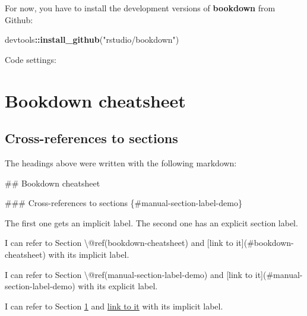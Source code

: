 \documentclass [11pt, proquest] {uwthesis}[2015/03/03]
\newenvironment{Shaded}{}{}
\newcommand{\KeywordTok}[1]{\textcolor[rgb]{0.00,0.44,0.13}{\textbf{{#1}}}}
\newcommand{\DataTypeTok}[1]{\textcolor[rgb]{0.56,0.13,0.00}{{#1}}}
\newcommand{\DecValTok}[1]{\textcolor[rgb]{0.25,0.63,0.44}{{#1}}}
\newcommand{\StringTok}[1]{\textcolor[rgb]{0.25,0.44,0.63}{{#1}}}
\newcommand{\OtherTok}[1]{\textcolor[rgb]{0.00,0.44,0.13}{{#1}}}
\newcommand{\FunctionTok}[1]{\textcolor[rgb]{0.02,0.16,0.49}{{#1}}}
\newcommand{\NormalTok}[1]{{#1}}
\newcommand{\OperatorTok}[1]{\textcolor[rgb]{0.00,0.44,0.13}{\textbf{{#1}}}}
\begin{document}
For now, you have to install the development versions of
\textbf{bookdown} from Github:
\begin{Shaded}
\begin{Highlighting}[]
\NormalTok{devtools}\OperatorTok{::}\KeywordTok{install_github}\NormalTok{(}\StringTok{"rstudio/bookdown"}\NormalTok{)}
\end{Highlighting}
\end{Shaded}
Code settings:
\begin{Shaded}
\end{Shaded}
\hypertarget{bookdown-cheatsheet}{\section{Bookdown
cheatsheet}\label{bookdown-cheatsheet}}

\hypertarget{manual-section-label-demo}{\subsection{Cross-references to
sections}\label{manual-section-label-demo}}

The headings above were written with the following markdown:
\begin{Shaded}
\begin{Highlighting}[]
\FunctionTok{## Bookdown cheatsheet}

\FunctionTok{### Cross-references to sections \{#manual-section-label-demo\}}
\end{Highlighting}
\end{Shaded}
The first one gets an implicit label. The second one has an explicit
section label.
\begin{Shaded}
\begin{Highlighting}[]
\NormalTok{I can refer to Section \textbackslash{}@ref(bookdown-cheatsheet) and }
\OtherTok{[link to it](#bookdown-cheatsheet)}\NormalTok{ with its implicit label.}

\NormalTok{I can refer to Section \textbackslash{}@ref(manual-section-label-demo) and }
\OtherTok{[link to it](#manual-section-label-demo)}\NormalTok{ with its explicit label.}
\end{Highlighting}
\end{Shaded}
I can refer to Section \ref{bookdown-cheatsheet} and
\protect\hyperlink{bookdown-cheatsheet}{link to it} with its implicit
label.
\end{document}
